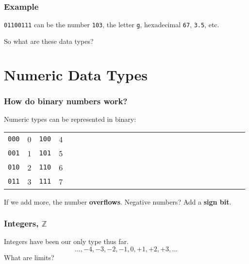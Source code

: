 \documentclass[11pt]{beamer}
\begin{document}
\begin{frame}
  \frametitle{Example}
  \Enlarge

  \texttt{01100111} can be the number \texttt{103}, the letter \texttt{g}, hexadecimal \texttt{67}, \texttt{3.5}, etc.
  \begin{itemize}
  \myitem  So what are these data types?
  \end{itemize}
\end{frame}

\section{Numeric Data Types}

\begin{frame}
  \frametitle{How do binary numbers work?}
  \Enlarge

  \begin{itemize}
  \myitem  Numeric types can be represented in binary:
    \begin{tabular}{*{27}{l}}
      \texttt{000} & 0 & \texttt{100} & 4 \\
      \texttt{001} & 1 & \texttt{101} & 5 \\
      \texttt{010} & 2 & \texttt{110} & 6 \\
      \texttt{011} & 3 & \texttt{111} & 7 \\
    \end{tabular} \pause
  \myitem  If we add more, the number \textbf{overflows}. \pause
  \myitem  Negative numbers?  Add a \textbf{sign bit}.
  \end{itemize}
\end{frame}

\begin{frame}
  \frametitle{Integers, $\mathbb{Z}$}
  \Enlarge

  \begin{itemize}
  \myitem  Integers have been our only type thus far. \\
    $$ ..., -4, -3, -2, -1, 0, +1, +2, +3, ... $$
  \myitem  What are limits?
  \end{itemize}
\end{frame}
\end{document}
